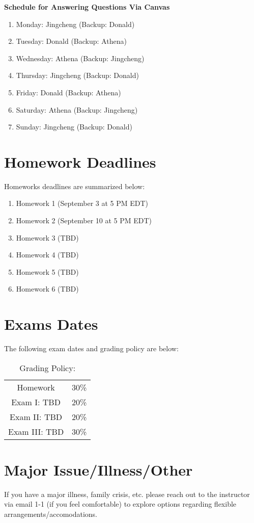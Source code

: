 \documentclass[11pt]{article}
\begin{document}
\textbf{Schedule for Answering Questions Via Canvas}
\begin{enumerate}
\item Monday: Jingcheng (Backup: Donald)
\item Tuesday: Donald (Backup: Athena)
\item Wednesday: Athena (Backup: Jingcheng)
\item Thursday: Jingcheng (Backup: Donald)
\item Friday: Donald (Backup: Athena)
\item Saturday: Athena (Backup: Jingcheng)
\item Sunday: Jingcheng (Backup: Donald)
\end{enumerate}



\section{Homework Deadlines}
Homeworks deadlines are summarized below:

\begin{enumerate}
\item Homework 1 (September 3 at 5 PM EDT)
\item Homework 2 (September 10 at 5 PM EDT)
\item Homework 3 (TBD)
\item Homework 4 (TBD)
\item Homework 5 (TBD)
\item Homework 6 (TBD)
\end{enumerate} 


\section{Exams Dates} 
The following exam dates and grading policy are below:

\begin{table}[h!]
\caption{Grading Policy:}
\begin{center}
\begin{tabular}{cc}
Homework &30\%\\
Exam I:  TBD &20\%\\
Exam  II: TBD & 20\%\\
Exam III:  TBD & 30\%\\
\end{tabular}
\end{center}
\label{default}
\end{table}%

\section{Major Issue/Illness/Other}

If you have a major illness, family crisis, etc. please reach out to the instructor via email 1-1 (if you feel comfortable) to explore options regarding flexible arrangements/accomodations.
\end{document}
